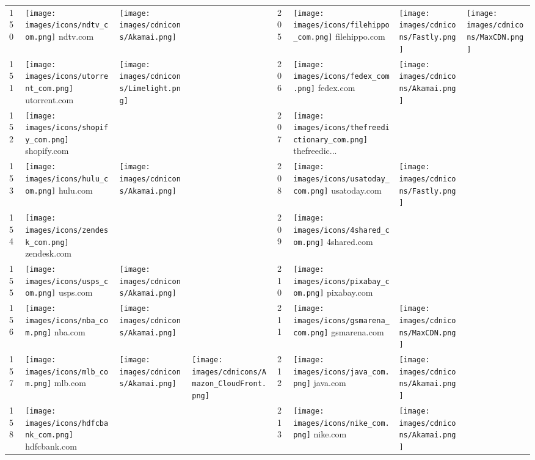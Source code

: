 \begin{table}[]
\begin{tabular}{|llll|llll|}
150 & \texttt{[image: images/icons/ndtv\_com.png]} ndtv.com & \texttt{[image: images/cdnicons/Akamai.png]} & & 205 & \texttt{[image: images/icons/filehippo\_com.png]} filehippo.com & \texttt{[image: images/cdnicons/Fastly.png]} & \texttt{[image: images/cdnicons/MaxCDN.png]} \\
151 & \texttt{[image: images/icons/utorrent\_com.png]} utorrent.com & \texttt{[image: images/cdnicons/Limelight.png]} & & 206 & \texttt{[image: images/icons/fedex\_com.png]} fedex.com & \texttt{[image: images/cdnicons/Akamai.png]} & \\
152 & \texttt{[image: images/icons/shopify\_com.png]} shopify.com & & & 207 & \texttt{[image: images/icons/thefreedictionary\_com.png]} thefreedic... & & \\
153 & \texttt{[image: images/icons/hulu\_com.png]} hulu.com & \texttt{[image: images/cdnicons/Akamai.png]} & & 208 & \texttt{[image: images/icons/usatoday\_com.png]} usatoday.com & \texttt{[image: images/cdnicons/Fastly.png]} & \\
154 & \texttt{[image: images/icons/zendesk\_com.png]} zendesk.com & & & 209 & \texttt{[image: images/icons/4shared\_com.png]} 4shared.com & & \\
155 & \texttt{[image: images/icons/usps\_com.png]} usps.com & \texttt{[image: images/cdnicons/Akamai.png]} & & 210 & \texttt{[image: images/icons/pixabay\_com.png]} pixabay.com & & \\
156 & \texttt{[image: images/icons/nba\_com.png]} nba.com & \texttt{[image: images/cdnicons/Akamai.png]} & & 211 & \texttt{[image: images/icons/gsmarena\_com.png]} gsmarena.com & \texttt{[image: images/cdnicons/MaxCDN.png]} & \\
157 & \texttt{[image: images/icons/mlb\_com.png]} mlb.com & \texttt{[image: images/cdnicons/Akamai.png]} & \texttt{[image: images/cdnicons/Amazon\_CloudFront.png]} & 212 & \texttt{[image: images/icons/java\_com.png]} java.com & \texttt{[image: images/cdnicons/Akamai.png]} & \\
158 & \texttt{[image: images/icons/hdfcbank\_com.png]} hdfcbank.com & & & 213 & \texttt{[image: images/icons/nike\_com.png]} nike.com & \texttt{[image: images/cdnicons/Akamai.png]} & \\

\end{tabular}
\end{table}
